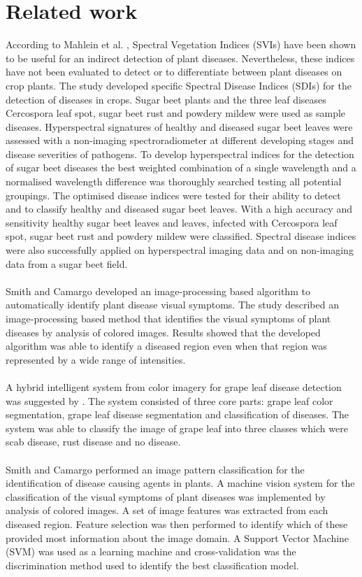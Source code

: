 \documentclass[conference]{IEEEtran}
\begin{document}
\section{Related work}
According to Mahlein et al. \cite{Mahlein201321}, Spectral Vegetation Indices (SVIs) have been shown to be useful for an indirect detection of plant diseases. Nevertheless, these indices have not been evaluated to detect or to differentiate between plant diseases on crop plants. The study developed specific Spectral Disease Indices (SDIs) for the detection of diseases in crops. Sugar beet plants and the three leaf diseases Cercospora leaf spot, sugar beet rust and powdery mildew were used as sample diseases. Hyperspectral signatures of healthy and diseased sugar beet leaves were assessed with a non-imaging spectroradiometer at different developing stages and disease severities of pathogens. To develop hyperspectral indices for the detection of sugar beet diseases the best weighted combination of a single wavelength and a normalised wavelength difference was thoroughly searched testing all potential groupings. The optimised disease indices were tested for their ability to detect and to classify healthy and diseased sugar beet leaves. With a high accuracy and sensitivity healthy sugar beet leaves and leaves, infected with Cercospora leaf spot, sugar beet rust and powdery mildew were classified. Spectral disease indices were also successfully applied on hyperspectral imaging data and on non-imaging data from a sugar beet field.\\ \\ Smith and Camargo \cite{Smith2009image} developed an image-processing based algorithm to automatically identify plant disease visual symptoms. The study described an image-processing based method that identifies the visual symptoms of plant diseases by analysis of colored images. Results showed that the developed algorithm was able to identify a diseased region even when that region was represented by a wide range of intensities.\\ \\ A hybrid intelligent system from color imagery for grape leaf disease detection was suggested by \cite{meunkaewjinda2008grape}. The system consisted of three core parts: grape leaf color segmentation, grape leaf disease segmentation and classification of diseases. The system was able to classify the image of grape leaf into three classes which were scab disease, rust disease and no disease.\\ \\ Smith and Camargo \cite{camargo2009image} performed an image pattern classification for the identification of disease causing agents in plants. A machine vision system for the classification of the visual symptoms of plant diseases was implemented by analysis of colored images. A set of image features was extracted from each diseased region. Feature selection was then performed to identify which of these provided most information about the image domain. A Support Vector Machine (SVM) was used as a learning machine and cross-validation was the discrimination method used to identify the best classification model.
\end{document}
